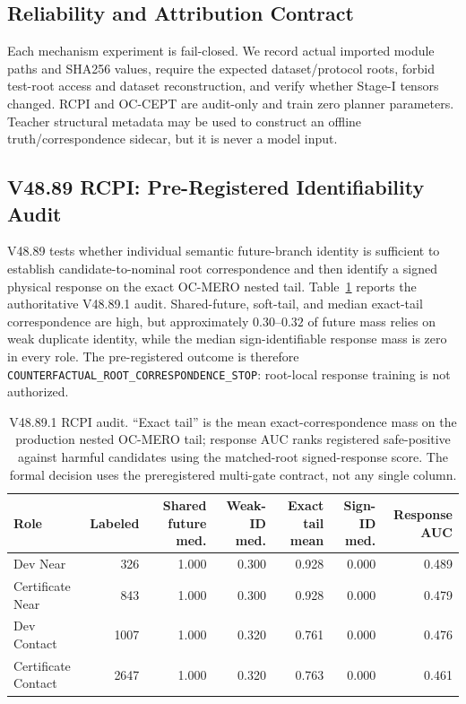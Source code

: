 \documentclass[conference]{IEEEtran}
\begin{document}
\subsection{Reliability and Attribution Contract}
Each mechanism experiment is fail-closed. We record actual imported module paths and SHA256 values, require the expected dataset/protocol roots, forbid test-root access and dataset reconstruction, and verify whether Stage-I tensors changed. RCPI and OC-CEPT are audit-only and train zero planner parameters. Teacher structural metadata may be used to construct an offline truth/correspondence sidecar, but it is never a model input.

\subsection{V48.89 RCPI: Pre-Registered Identifiability Audit}
\label{subsec:rcpi_results}
V48.89 tests whether individual semantic future-branch identity is sufficient to establish candidate-to-nominal root correspondence and then identify a signed physical response on the exact OC-MERO nested tail. Table~\ref{tab:rcpi} reports the authoritative V48.89.1 audit. Shared-future, soft-tail, and median exact-tail correspondence are high, but approximately $0.30$--$0.32$ of future mass relies on weak duplicate identity, while the median sign-identifiable response mass is zero in every role. The pre-registered outcome is therefore \texttt{COUNTERFACTUAL\_ROOT\_CORRESPONDENCE\_STOP}: root-local response training is not authorized.

\begin{table}[t]
\centering
\caption{V48.89.1 RCPI audit. ``Exact tail'' is the mean exact-correspondence mass on the production nested OC-MERO tail; response AUC ranks registered safe-positive against harmful candidates using the matched-root signed-response score. The formal decision uses the preregistered multi-gate contract, not any single column.}
\label{tab:rcpi}
\begin{tabular}{lrrrrrr}
\toprule
Role & Labeled & Shared future med. & Weak-ID med. & Exact tail mean & Sign-ID med. & Response AUC \\
\midrule
Dev Near & 326 & 1.000 & 0.300 & 0.928 & 0.000 & 0.489 \\
Certificate Near & 843 & 1.000 & 0.300 & 0.928 & 0.000 & 0.479 \\
Dev Contact & 1007 & 1.000 & 0.320 & 0.761 & 0.000 & 0.476 \\
Certificate Contact & 2647 & 1.000 & 0.320 & 0.763 & 0.000 & 0.461 \\
\bottomrule
\end{tabular}
\end{table}
\end{document}

